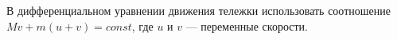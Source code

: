 В дифференциальном уравнении движения тележки использовать соотношение $Mv+m\left(u+v\right)=const$, где $u$ и $v$ ---
переменные скорости.
